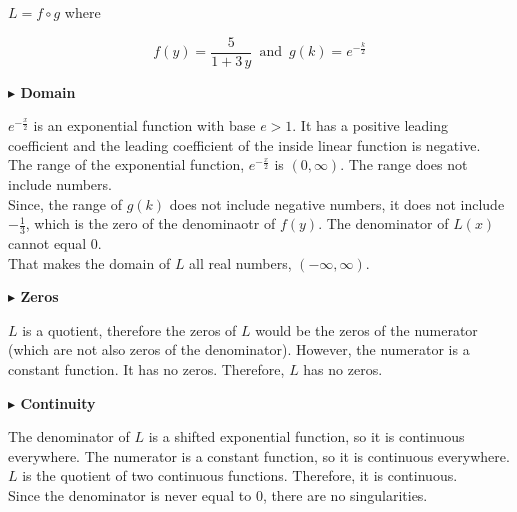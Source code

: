 \documentclass{ximera}
\begin{document}
\begin{example}
$L = f \circ g$ where

\[  f(y) =  \frac{5}{1 + 3 \, y}  \, \text{ and } \, g(k) = e^{-\tfrac{k}{2}}    \]




\textbf{\textcolor{blue!55!black}{$\blacktriangleright$ Domain}} 

$e^{-\tfrac{x}{2}}$ is an exponential function with base $e > 1$.  It has a positive leading coefficient and the leading coefficient of the inside linear function is negative. \\



The range of the exponential function, $e^{-\tfrac{x}{2}}$ is $(0, \infty)$. The range does not include   numbers. \\



Since, the range of $g(k)$ does not include negative numbers, it does not include $-\frac{1}{3}$, which is the zero of the denominaotr of $f(y)$.  The denominator of $L(x)$ cannot equal $0$.  \\


 That makes the domain of $L$ all real numbers, $(-\infty, \infty)$.














\textbf{\textcolor{blue!55!black}{$\blacktriangleright$ Zeros}} 



$L$ is a quotient, therefore the zeros of $L$ would be the zeros of the numerator (which are not also zeros of the denominator).  However, the numerator is a constant function.  It has no zeros. Therefore, $L$ has no zeros.










\textbf{\textcolor{blue!55!black}{$\blacktriangleright$ Continuity}} 


The denominator of $L$ is a shifted exponential function, so it is continuous everywhere. The numerator is a constant function, so it is continuous everywhere.  $L$ is the quotient of two continuous functions.  Therefore, it is continuous. \\


Since the denominator is never equal to $0$, there are no singularities. \\















\end{example}
\end{document}
